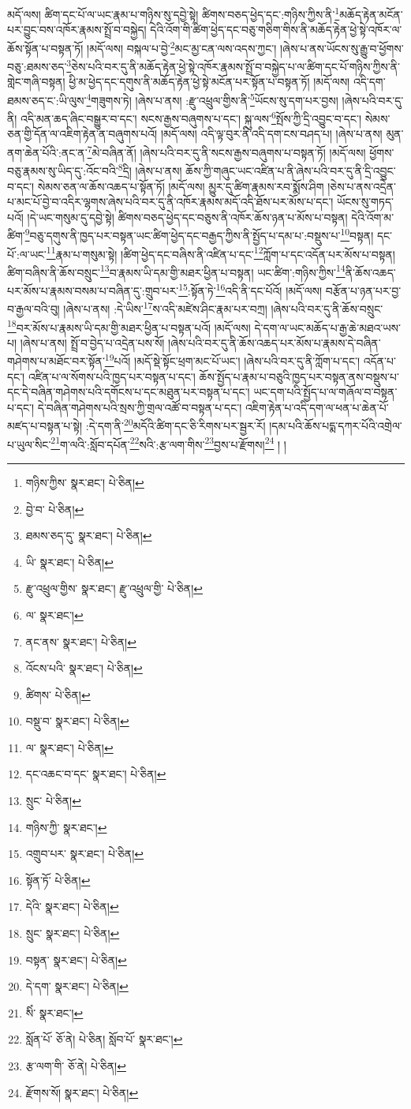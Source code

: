 མདོ་ལས། ཚིག་དང་པོ་ལ་ཡང་རྣམ་པ་གཉིས་སུ་དབྱེ་སྟེ། ཚིགས་བཅད་ཕྱེད་དང་:གཉིས་ཀྱིས་ནི་\footnote{གཉིས་ཀྱིས་  སྣར་ཐང་།  པེ་ཅིན། }མཆོད་རྟེན་མངོན་པར་བྱུང་བས་འཁོར་རྣམས་སྤྲོ་བ་བསྐྱེད། དེའི་འོག་གི་ཚིག་ཕྱེད་དང་བཅུ་གཅིག་གིས་ནི་མཆོད་རྟེན་ཕྱེ་སྟེ་འཁོར་ལ་ཆོས་སྟོན་པ་བསྟན་ཏོ། །མདོ་ལས། བསྐལ་པ་བྱེ་\footnote{བྱེ་བ་  པེ་ཅིན། }མང་མྱ་ངན་ལས་འདས་ཀྱང་། །ཞེས་པ་ནས་ཡོངས་སུ་རྒྱུ་བ་ཕྱོགས་བཅུ་:ཐམས་ཅད་\footnote{ཐམས་ཅད་དུ་  སྣར་ཐང་།  པེ་ཅིན། }ཅེས་པའི་བར་དུ་ནི་མཆོད་རྟེན་ཕྱེ་སྟེ་འཁོར་རྣམས་སྤྲོ་བ་བསྐྱེད་པ་ལ་ཚིག་དང་པོ་གཉིས་ཀྱིས་ནི་གླེང་གཞི་བསྟན། ཕྱི་མ་ཕྱེད་དང་དགུས་ནི་མཆོད་རྟེན་ཕྱེ་སྟེ་མངོན་པར་སྟོན་པ་བསྟན་ཏོ། །མདོ་ལས། འདི་དག་ཐམས་ཅད་ང་:ཡི་ལུས་\footnote{ཡི་  སྣར་ཐང་།  པེ་ཅིན། }གཟུགས་ཏེ། །ཞེས་པ་ནས། :རྫུ་འཕྲུལ་གྱིས་ནི་\footnote{རྫུ་འཕྲུལ་གྱིས་  སྣར་ཐང་། རྫུ་འཕྲུལ་གྱི་  པེ་ཅིན། }ཡོངས་སུ་དག་པར་བྱས། །ཞེས་པའི་བར་དུ་ནི། འདི་མན་ཆད་ཞིང་བསྒྱུར་བ་དང་། སངས་རྒྱས་བཞུགས་པ་དང་། སྐུ་ལས་\footnote{ལ་  སྣར་ཐང་། }སྤོས་ཀྱི་དྲི་འབྱུང་བ་དང་། སེམས་ཅན་གྱི་དོན་ལ་འཇིག་རྟེན་ན་བཞུགས་པའོ། །མདོ་ལས། འདི་ལྟ་བུར་ནི་འདི་དག་ངས་བཤད་པ། །ཞེས་པ་ནས། མུན་ནག་ཆེན་པོའི་:ནང་ན་\footnote{ནང་ནས་  སྣར་ཐང་།  པེ་ཅིན། }མེ་བཞིན་ནོ། །ཞེས་པའི་བར་དུ་ནི་སངས་རྒྱས་བཞུགས་པ་བསྟན་ཏོ། །མདོ་ལས། ཕྱོགས་བཅུ་རྣམས་སུ་ཡིད་དུ་:འོང་བའི་\footnote{འོངས་པའི་  སྣར་ཐང་།  པེ་ཅིན། }དྲི། །ཞེས་པ་ནས། ཆོས་ཀྱི་གཞུང་ཡང་འཛིན་པ་ནི་ཞེས་པའི་བར་དུ་ནི་དྲི་འབྱུང་བ་དང་། སེམས་ཅན་ལ་ཆོས་འཆད་པ་སྟོན་ཏོ། །མདོ་ལས། མྱུར་དུ་ཚིག་རྣམས་རབ་སྨོས་ཤིག །ཅེས་པ་ནས་འདྲེན་པ་མང་པོ་བྱེ་བ་འདིར་ལྷགས་ཞེས་པའི་བར་དུ་ནི་འཁོར་རྣམས་མདོ་འདི་ཐོས་པར་མོས་པ་དང་། ཡོངས་སུ་གཏད་པའོ། །དེ་ཡང་གསུམ་དུ་དབྱེ་སྟེ། ཚིགས་བཅད་ཕྱེད་དང་བཅུས་ནི་འཁོར་ཆོས་ཉན་པ་མོས་པ་བསྟན། དེའི་འོག་མ་ཚིག་\footnote{ཚིགས་  པེ་ཅིན། }བཅུ་དགུས་ནི་ཁྱད་པར་བསྟན་ཡང་ཚིག་ཕྱེད་དང་བརྒྱད་ཀྱིས་ནི་སྤྱོད་པ་དམ་པ་:བསྡུས་པ་\footnote{བསྡུ་བ་  སྣར་ཐང་།  པེ་ཅིན། }བསྟན། དང་པོ་:ལ་ཡང་\footnote{ལ་  སྣར་ཐང་།  པེ་ཅིན། }རྣམ་པ་གསུམ་སྟེ། །ཚིག་ཕྱེད་དང་བཞིས་ནི་འཛིན་པ་དང་\footnote{དང་འཆང་བ་དང་  སྣར་ཐང་།  པེ་ཅིན། }ཀློག་པ་དང་འདོན་པར་མོས་པ་བསྟན། ཚིག་བཞིས་ནི་ཆོས་བསྲུང་\footnote{སྲུང་  པེ་ཅིན། }བ་རྣམས་ཡི་དམ་གྱི་མཐར་ཕྱིན་པ་བསྟན། ཡང་ཚིག་:གཉིས་ཀྱིས་\footnote{གཉིས་ཀྱི་  སྣར་ཐང་། }ནི་ཆོས་འཆད་པར་མོས་པ་རྣམས་བསམ་པ་བཞིན་དུ་:གྲུབ་པར་\footnote{འགྲུབ་པར་  སྣར་ཐང་།  པེ་ཅིན། }:སྟོན་ཏེ་\footnote{སྟོན་ཏོ་  པེ་ཅིན། }འདི་ནི་དང་པོའོ། །མདོ་ལས། བརྩོན་པ་ཉན་པར་བྱ་བ་རྒྱལ་བའི་བུ། །ཞེས་པ་ནས། :དེ་ཡིས་\footnote{དེའི་  སྣར་ཐང་།  པེ་ཅིན། }ས་འདི་མཛེས་ཤིང་རྣམ་པར་བཀྲ། །ཞེས་པའི་བར་དུ་ནི་ཆོས་བསྲུང་\footnote{སྲུང་  སྣར་ཐང་།  པེ་ཅིན། }བར་མོས་པ་རྣམས་ཡི་དམ་གྱི་མཐར་ཕྱིན་པ་བསྟན་པའོ། །མདོ་ལས། དེ་དག་ལ་ཡང་མཆོད་པ་རྒྱ་ཆེ་མཐའ་ཡས་པ། །ཞེས་པ་ནས། སྤྲོ་བ་བྱེད་པ་འདྲེན་པས་སོ། །ཞེས་པའི་བར་དུ་ནི་ཆོས་འཆད་པར་མོས་པ་རྣམས་དེ་བཞིན་གཤེགས་པ་མཐོང་བར་སྟོན་\footnote{བསྟན་  སྣར་ཐང་།  པེ་ཅིན། }པའོ། །མདོ་སྡེ་སྟོང་ཕྲག་མང་པོ་ཡང་། །ཞེས་པའི་བར་དུ་ནི་ཀློག་པ་དང་། འདོན་པ་དང་། འཛིན་པ་ལ་སོགས་པའི་ཁྱད་པར་བསྟན་པ་དང་། ཆོས་སྤྱོད་པ་རྣམ་པ་བཅུའི་ཁྱད་པར་བསྟན་ནས་བསྡུས་པ་དང་དེ་བཞིན་གཤེགས་པའི་དགོངས་པ་དང་མཐུན་པར་བསྟན་པ་དང་། ཡང་དག་པའི་སྤྱོད་པ་ལ་གཞོལ་བ་བསྟན་པ་དང་། དེ་བཞིན་གཤེགས་པའི་སྲས་ཀྱི་གྲལ་འཚོ་བ་བསྟན་པ་དང་། འཇིག་རྟེན་པ་འདི་དག་ལ་ཕན་པ་ཆེན་པོ་མཛད་པ་བསྟན་པ་སྟེ། :དེ་དག་ནི་\footnote{དེ་དག་  སྣར་ཐང་།  པེ་ཅིན། }མདོའི་ཚིག་དང་ཅི་རིགས་པར་སྦྱར་རོ། །དམ་པའི་ཆོས་པདྨ་དཀར་པོའི་འགྲེལ་པ་ཡུལ་སིང་\footnote{སིཾ་  སྣར་ཐང་། }ག་ལའི་:སློབ་དཔོན་\footnote{སློན་པོ་  ཅོ་ནེ།  པེ་ཅིན། སློབ་པོ་  སྣར་ཐང་། }སའི་:རྩ་ལག་གིས་\footnote{རྩ་ལག་གི་  ཅོ་ནེ།  པེ་ཅིན། }བྱས་པ་རྫོགས།\footnote{རྫོགས་སོ།  སྣར་ཐང་།  པེ་ཅིན། } ། །
